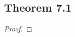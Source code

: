 \documentclass[../../main.tex]{subfiles}
\begin{document}
\subsection{Theorem 7.1}
\begin{wts}

\end{wts}
\begin{proof}

\end{proof}
\end{document}
